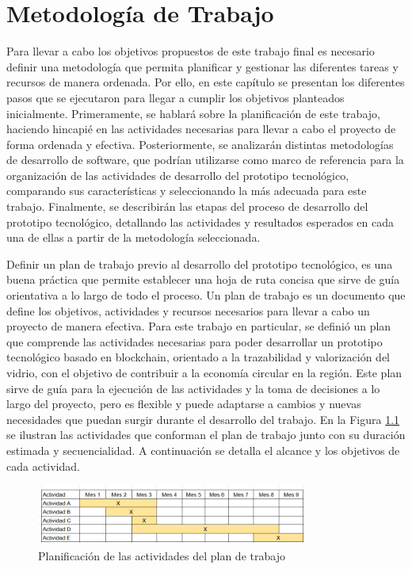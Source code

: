 \chapter[Metodología de Trabajo]{Metodología de Trabajo}
\label{cp:methodology}

\parindent0pt

Para llevar a cabo los objetivos propuestos de este trabajo final es necesario definir una metodología que permita planificar y gestionar las diferentes tareas y recursos de manera ordenada. Por ello, en este capítulo se presentan los diferentes pasos que se ejecutaron para llegar a cumplir los objetivos planteados inicialmente. Primeramente, se hablará sobre la planificación de este trabajo, haciendo hincapié en las actividades necesarias para llevar a cabo el proyecto de forma ordenada y efectiva. Posteriormente, se analizarán distintas metodologías de desarrollo de software, que podrían utilizarse como marco de referencia para la organización de las actividades de desarrollo del prototipo tecnológico, comparando sus características y seleccionando la más adecuada para este trabajo. Finalmente, se describirán las etapas del proceso de desarrollo del prototipo tecnológico, detallando las actividades y resultados esperados en cada una de ellas a partir de la metodología seleccionada.

Definir un plan de trabajo previo al desarrollo del prototipo tecnológico, es una buena práctica que permite establecer una hoja de ruta concisa que sirve de guía orientativa a lo largo de todo el proceso. Un plan de trabajo es un documento que define los objetivos, actividades y recursos necesarios para llevar a cabo un proyecto de manera efectiva. Para este trabajo en particular, se definió un plan que comprende las actividades necesarias para poder desarrollar un prototipo tecnológico basado en blockchain, orientado a la trazabilidad y valorización del vidrio, con el objetivo de contribuir a la economía circular en la región. Este plan sirve de guía para la ejecución de las actividades y la toma de decisiones a lo largo del proyecto, pero es flexible y puede adaptarse a cambios y nuevas necesidades que puedan surgir durante el desarrollo del trabajo. En la Figura \ref{fig:activities-plan} se ilustran las actividades que conforman el plan de trabajo junto con su duración estimada y secuencialidad. A continuación se detalla el alcance y los objetivos de cada actividad.

\begin{figure}[!htb]
    \centering
    \includegraphics[width=0.8\textwidth]{Figures/activities-plan.png}
    \caption{Planificación de las actividades del plan de trabajo}
    \label{fig:activities-plan}
\end{figure}


